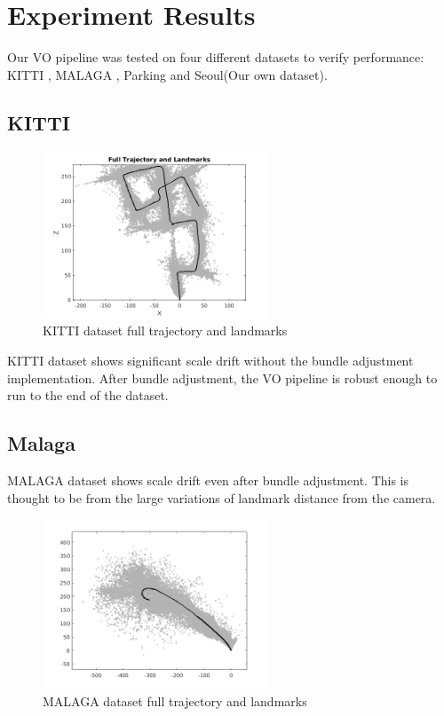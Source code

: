\chapter{Experiment Results} \label{chap:experiment}
Our VO pipeline was tested on four different datasets to verify performance: KITTI \cite{Fritsch2013ITSC}, MALAGA \cite{blanco2013mlgdataset}, Parking and Seoul(Our own dataset).

\section{KITTI}

\begin{figure}[h]
\centering
\includegraphics[width=0.6\textwidth]{Results_KITTI.png}
\caption{KITTI dataset full trajectory and landmarks}
\end{figure}

KITTI dataset shows significant scale drift without the bundle adjustment implementation. After bundle adjustment, the VO pipeline is robust enough to run to the end of the dataset. 
\section{Malaga} \label{sec:malaga}
MALAGA dataset shows scale drift even after bundle adjustment. This is thought to be from the large variations of landmark distance from the camera.

\begin{figure}[h]
\centering
\includegraphics[width=0.6\textwidth]{Results_MALAGA.png}
\caption{MALAGA dataset full trajectory and landmarks}
\label{fig:	results_malaga}
\end{figure}

